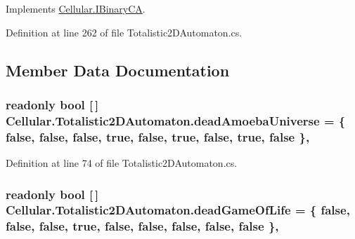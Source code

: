 Implements \hyperlink{interface_cellular_1_1_i_binary_c_a_aa67feabf5d1513aa74076d255c661948}{Cellular.\+I\+Binary\+C\+A}.



Definition at line 262 of file Totalistic2\+D\+Automaton.\+cs.



\subsection{Member Data Documentation}
\hypertarget{class_cellular_1_1_totalistic2_d_automaton_a5b2dd1d361797410beda7ea765b40c31}{}
\subsubsection[{dead\+Amoeba\+Universe}]{\setlength{\rightskip}{0pt plus 5cm}readonly bool \mbox{[}$\,$\mbox{]} Cellular.\+Totalistic2\+D\+Automaton.\+dead\+Amoeba\+Universe = \{ false, false, false, true, false, true, false, true, false \}\hspace{0.3cm}{\ttfamily [static]}, {\ttfamily [protected]}}\label{class_cellular_1_1_totalistic2_d_automaton_a5b2dd1d361797410beda7ea765b40c31}


Definition at line 74 of file Totalistic2\+D\+Automaton.\+cs.

\hypertarget{class_cellular_1_1_totalistic2_d_automaton_aa4888d1ead2dfcdb1c90c79485aed255}{}
\subsubsection[{dead\+Game\+Of\+Life}]{\setlength{\rightskip}{0pt plus 5cm}readonly bool \mbox{[}$\,$\mbox{]} Cellular.\+Totalistic2\+D\+Automaton.\+dead\+Game\+Of\+Life = \{ false, false, false, true, false, false, false, false, false \}\hspace{0.3cm}{\ttfamily [static]}, {\ttfamily [protected]}}\label{class_cellular_1_1_totalistic2_d_automaton_aa4888d1ead2dfcdb1c90c79485aed255}



